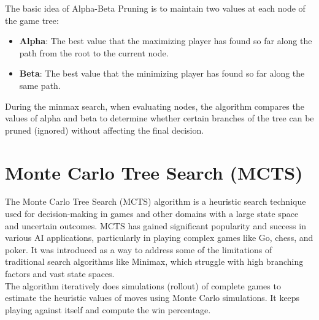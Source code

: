 \documentclass{article}
\begin{document}
The basic idea of Alpha-Beta Pruning is to maintain two values at each node of the game tree:

\begin{itemize}
    \item \textbf{Alpha}: The best value that the maximizing player has found so far along the path from the root to the current node.
    \item \textbf{Beta}: The best value that the minimizing player has found so far along the same path.
\end{itemize}

During the minmax search, when evaluating nodes, the algorithm compares the values of alpha and beta to determine whether certain branches of the tree can be pruned (ignored) without affecting the final decision.

\section{Monte Carlo Tree Search (MCTS)}

The Monte Carlo Tree Search (MCTS) algorithm is a heuristic search technique used for decision-making in games and other domains with a large state space and uncertain outcomes. MCTS has gained significant popularity and success in various AI applications, particularly in playing complex games like Go, chess, and poker. It was introduced as a way to address some of the limitations of traditional search algorithms like Minimax, which struggle with high branching factors and vast state spaces. \\

The algorithm iteratively does simulations (rollout) of complete games to estimate the heuristic values of moves using Monte Carlo simulations. It keeps playing against itself and compute the win percentage. 
\end{document}

